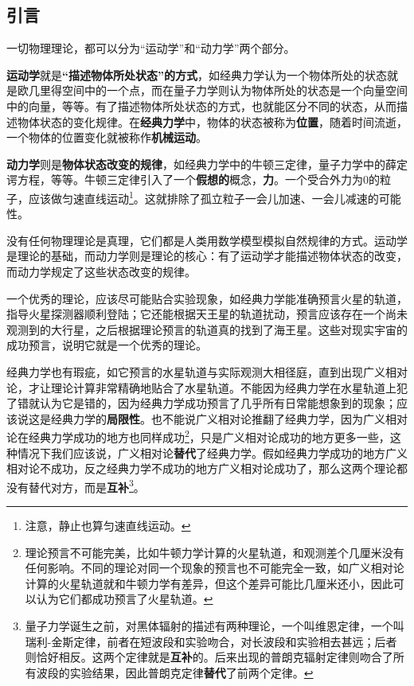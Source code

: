 
\subsection{引言}

一切物理理论，都可以分为“运动学”和“动力学”两个部分。

\textbf{运动学}就是\textbf{“描述物体所处状态”的方式}，如经典力学认为一个物体所处的状态就是欧几里得空间中的一个点，而在量子力学则认为物体所处的状态是一个向量空间中的向量，等等。有了描述物体所处状态的方式，也就能区分不同的状态，从而描述物体状态的变化规律。在\textbf{经典力学}中，物体的状态被称为\textbf{位置}，随着时间流逝，一个物体的位置变化就被称作\textbf{机械运动}。

\textbf{动力学}则是\textbf{物体状态改变的规律}，如经典力学中的牛顿三定律，量子力学中的薛定谔方程，等等。牛顿三定律引入了一个\textbf{假想的}概念，\textbf{力}。一个受合外力为$0$的粒子，应该做匀速直线运动\footnote{注意，静止也算匀速直线运动。}。这就排除了孤立粒子一会儿加速、一会儿减速的可能性。

没有任何物理理论是真理，它们都是人类用数学模型模拟自然规律的方式。运动学是理论的基础，而动力学则是理论的核心：有了运动学才能描述物体状态的改变，而动力学规定了这些状态改变的规律。

一个优秀的理论，应该尽可能贴合实验现象，如经典力学能准确预言火星的轨道，指导火星探测器顺利登陆；它还能根据天王星的轨道扰动，预言应该存在一个尚未观测到的大行星，之后根据理论预言的轨道真的找到了海王星。这些对现实宇宙的成功预言，说明它就是一个优秀的理论。

经典力学也有瑕疵，如它预言的水星轨道与实际观测大相径庭，直到出现广义相对论，才让理论计算非常精确地贴合了水星轨道。不能因为经典力学在水星轨道上犯了错就认为它是错的，因为经典力学成功预言了几乎所有日常能想象到的现象；应该说这是经典力学的\textbf{局限性}。也不能说广义相对论推翻了经典力学，因为广义相对论在经典力学成功的地方也同样成功\footnote{理论预言不可能完美，比如牛顿力学计算的火星轨道，和观测差个几厘米没有任何影响。不同的理论对同一个现象的预言也不可能完全一致，如广义相对论计算的火星轨道就和牛顿力学有差异，但这个差异可能比几厘米还小，因此可以认为它们都成功预言了火星轨道。}，只是广义相对论成功的地方更多一些，这种情况下我们应该说，广义相对论\textbf{替代}了经典力学。假如经典力学成功的地方广义相对论不成功，反之经典力学不成功的地方广义相对论成功了，那么这两个理论都没有替代对方，而是\textbf{互补}\footnote{量子力学诞生之前，对黑体辐射的描述有两种理论，一个叫维恩定律，一个叫瑞利-金斯定律，前者在短波段和实验吻合，对长波段和实验相去甚远；后者则恰好相反。这两个定律就是\textbf{互补}的。后来出现的普朗克辐射定律则吻合了所有波段的实验结果，因此普朗克定律\textbf{替代}了前两个定律。}。

